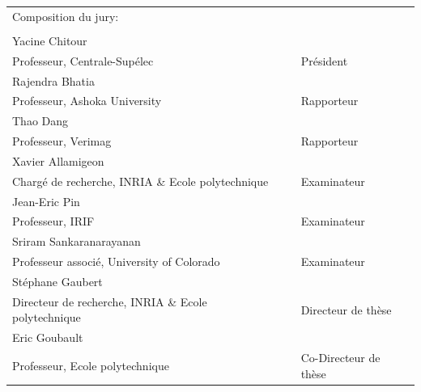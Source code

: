 \documentclass[a4paper]{article}
\begin{document}
\begin{tabular}{lp{1.5cm}l}
Composition du jury: & & \\ 
& & \\

Yacine Chitour
 & & \\ \small
Professeur, Centrale-Supélec
 & & \small 
Président
\\

Rajendra Bhatia
 & & \\ \small
Professeur, Ashoka University
 & &  \small 
Rapporteur
\\

Thao Dang
 & & \\ \small
Professeur, Verimag
 & & \small
Rapporteur
\\

Xavier Allamigeon
 & & \\ \small
Chargé de recherche, INRIA \& Ecole polytechnique  
 & & \small
Examinateur
\\

Jean-Eric Pin
 & & \\ \small
Professeur, IRIF
 & & \small 
Examinateur
\\

Sriram Sankaranarayanan
 & & \\ \small
Professeur associé, University of Colorado
 & & \small 
Examinateur
\\

Stéphane Gaubert
 & & \\ \small
Directeur de recherche, INRIA \& Ecole polytechnique
 & & \small 
Directeur de thèse
\\

Eric Goubault
 & & \\ \small
Professeur, Ecole polytechnique
 & & \small 
Co-Directeur de thèse

\end{tabular}
\end{document}
